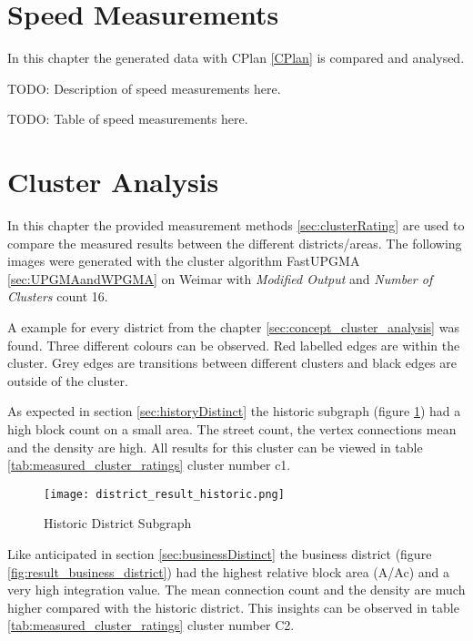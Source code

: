 \section{Speed Measurements} \label{sec:measurements-speed}
In this chapter the generated data with CPlan \ref{CPlan} is compared and analysed.

TODO: Description of speed measurements here. 

TODO: Table of speed measurements here.

\pagebreak
\section{Cluster Analysis}
\label{sec:measurements-cluster-analysis}
In this chapter the provided measurement methods \ref{sec:clusterRating} are used to compare the measured results between the different districts/areas. The following images were generated with the cluster algorithm FastUPGMA \ref{sec:UPGMAandWPGMA} on Weimar with \textit{Modified Output} and \textit{Number of Clusters} count 16.

A example for every district from the chapter \ref{sec:concept_cluster_analysis} was found. Three different colours can be observed. Red labelled edges are within the cluster. Grey edges are transitions between different clusters and black edges are outside of the cluster.

As expected in section \ref{sec:historyDistinct} the historic subgraph (figure \ref{fig:result_historic_district}) had a high block count on a small area. The street count, the vertex connections mean and the density are high. All results for this cluster can be viewed in table \ref{tab:measured_cluster_ratings} cluster number c1.

\begin{figure}[ht]
    \centering
    \begin{mdframed}[style=mdthight, userdefinedwidth=0.4\textwidth, align=center]
        \texttt{[image: district\_result\_historic.png]}
    \end{mdframed}
    \caption{Historic District Subgraph}
    \label{fig:result_historic_district}
\end{figure}
\FloatBarrier

Like anticipated in section \ref{sec:businessDistinct} the business district (figure \ref{fig:result_business_district}) had the highest relative block area (A/Ac) and a very high integration value. The mean connection count and the density are much higher compared with the historic district. This insights can be observed in table \ref{tab:measured_cluster_ratings} cluster number C2.

